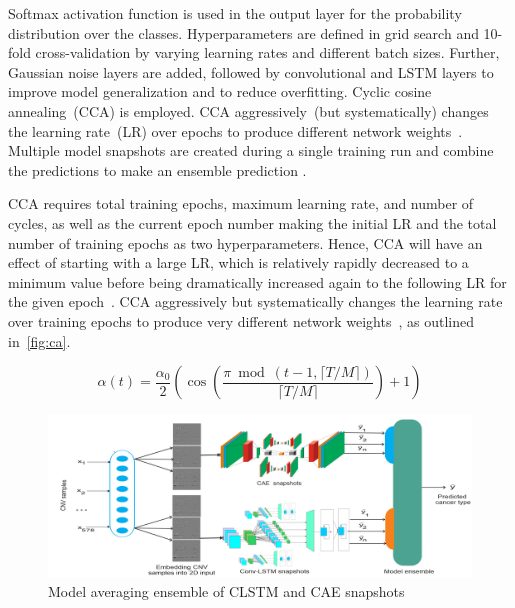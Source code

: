 \hspace*{3.5mm} Softmax activation function is used in the output layer for the probability distribution over the classes. Hyperparameters are defined in grid search and 10-fold cross-validation by varying learning rates and different batch sizes. Further, Gaussian noise layers are added, followed by convolutional and LSTM layers to improve model generalization and to reduce overfitting. 
Cyclic cosine annealing~(CCA) is employed. CCA  aggressively~(but systematically) changes the learning rate~(LR) over epochs to produce different network weights~\cite{loshchilov2016sgdr}. Multiple model snapshots are created during a single training run and combine the predictions to make an ensemble prediction \cite{huang2017snapshot}. 

\hspace*{3.5mm} CCA requires total training epochs, maximum learning rate, and number of cycles, as well as the current epoch number making the initial LR and the total number of training epochs as two hyperparameters. Hence, CCA will have an effect of starting with a large LR, which is relatively rapidly decreased to a minimum value before being dramatically increased again to the following LR for the given epoch~\cite{huang2017snapshot}. CCA aggressively but systematically changes the learning rate over training epochs to produce very different network weights~\cite{loshchilov2016sgdr}, as outlined in~\cref{fig:ca}. 

\begin{equation}
    \label{eq:lr-cosine}
    \alpha(t)=\frac{\alpha_{0}}{2}\left(\cos \left(\frac{\pi \bmod (t-1,\lceil T / M\rceil)}{\lceil T / M\rceil}\right)+1\right)
\end{equation}

\begin{figure}
    \centering
        \includegraphics[scale=0.65]{images/ensemble.png}
    \caption{Model averaging ensemble of CLSTM and CAE snapshots~\cite{karimACCA2019}}
    \label{fig:mae}
    \vspace{-2mm}
\end{figure}

